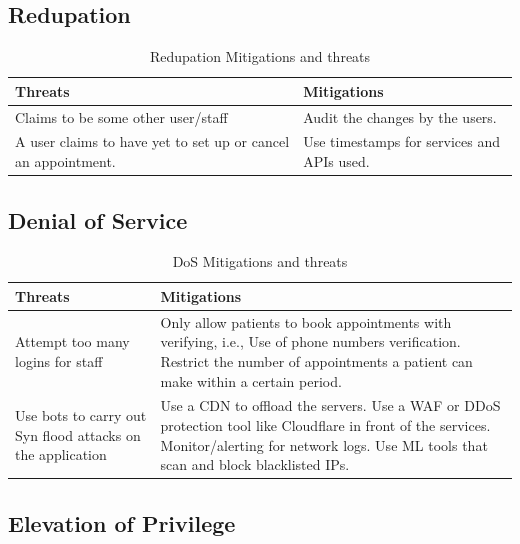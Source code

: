\subsection{Redupation}
\begingroup
\centering
\setlength{\tabcolsep}{6.5pt} %
\renewcommand{\arraystretch}{1.8} %
\begin{longtable}{ |p{7cm}| p{8cm} |}
\caption{Redupation Mitigations and threats}
    \label{table:redupation}
\hline
\textbf{Threats} & \textbf{Mitigations}\\
\hline
Claims to be some other user/staff & Audit the changes by the users.\\
\hline
A user claims to have yet to set up or cancel an appointment. & Use timestamps for services and APIs used.\\
\hline
\end{longtable}
\endgroup


\subsection{Denial of Service}
\begingroup
\centering
\setlength{\tabcolsep}{6.5pt} %
\renewcommand{\arraystretch}{1.8} %
\begin{longtable}{ |p{7cm}| p{8cm} |}
\caption{DoS Mitigations and threats}
    \label{table:dos}
\hline
\textbf{Threats} & \textbf{Mitigations} \\
\hline
Attempt too many logins for staff & Only allow patients to book appointments with verifying, i.e., Use of phone numbers verification. \newline
Restrict the number of appointments a patient can make within a certain period.\\
\hline
Use bots to carry out Syn flood attacks on the application & Use a CDN to offload the servers.\newline 
Use a WAF or DDoS protection tool like Cloudflare in front of the services.\newline
Monitor/alerting for network logs.\newline
Use ML tools that scan and block blacklisted IPs.
\\
\hline
\end{longtable}
\endgroup


\subsection{Elevation of Privilege}

